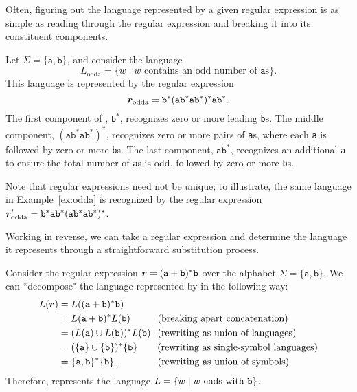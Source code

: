 Often, figuring out the language represented by a given regular expression is as simple as reading through the regular expression and breaking it into its constituent components.

\begin{example}\label{ex:odda}
Let $\Sigma = \{\texttt{a}, \texttt{b}\}$, and consider the language
\begin{equation*}
L_{\text{odda}} = \{w \mid w \text{ contains an odd number of } \texttt{a} \text{s}\}.
\end{equation*}
This language is represented by the regular expression
\begin{equation*}
\bm r_{\text{odda}} = \texttt{b}^{*}(\texttt{ab}^{*}\texttt{ab}^{*})^{*}\texttt{ab}^{*}.
\end{equation*}
The first component of , $\texttt{b}^{*}$, recognizes zero or more leading \texttt{b}s. The middle component, $(\texttt{ab}^{*}\texttt{ab}^{*})^{*}$, recognizes zero or more pairs of \texttt{a}s, where each \texttt{a} is followed by zero or more \texttt{b}s. The last component, $\texttt{ab}^{*}$, recognizes an additional \texttt{a} to ensure the total number of \texttt{a}s is odd, followed by zero or more \texttt{b}s.
\end{example}

Note that regular expressions need not be unique; to illustrate, the same language in Example~\ref{ex:odda} is recognized by the regular expression $\bm r'_{\text{odda}} = \texttt{b}^{*}\texttt{ab}^{*}(\texttt{ab}^{*}\texttt{ab}^{*})^{*}$.

Working in reverse, we can take a regular expression and determine the language it represents through a straightforward substitution process.

\begin{example}
Consider the regular expression $\bm r = (\texttt{a} + \texttt{b})^{*}\texttt{b}$ over the alphabet $\Sigma = \{\texttt{a}, \texttt{b}\}$. We can ``decompose" the language represented by  in the following way:
\begin{align*}
L(\bm r)	& = L((\texttt{a} + \texttt{b})^{*}\texttt{b}) \\
			& = L(\texttt{a} + \texttt{b})^{*}L(\texttt{b}) \hspace{1cm} \text{(breaking apart concatenation)} \\
			& = (L(\texttt{a}) \cup L(\texttt{b}))^{*}L(\texttt{b}) \hspace{0.25cm} \text{(rewriting as union of languages)} \\
			& = (\{\texttt{a}\} \cup \{\texttt{b}\})^{*}\{\texttt{b}\} \hspace{0.725cm} \text{(rewriting as single-symbol languages)} \\
			& = \{\texttt{a}, \texttt{b}\}^{*}\{\texttt{b}\}. \hspace{1.5cm} \text{(rewriting as union of symbols)}
\end{align*}
Therefore,  represents the language $L = \{w \mid w \text{ ends with \texttt{b}}\}$.
\end{example}


